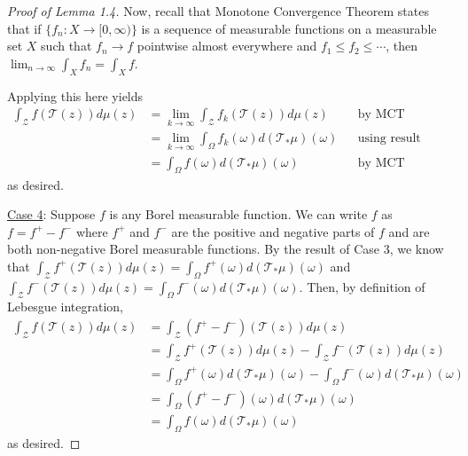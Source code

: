 \documentclass{article}
\begin{document}
\begin{proof}[Proof of Lemma 1.4]
    Now, recall that Monotone Convergence Theorem states that if $\{f_n: X \rightarrow [0, \infty) \}$ is a sequence of measurable functions on a measurable set $X$ such that $f_n \rightarrow f$ pointwise almost everywhere and $f_1 \leq f_2 \leq \cdots$, then $\lim_{n \rightarrow \infty} \int_{X} f_n = \int_{X} f$.

    Applying this here yields
    \begin{align*}
        \int_{\mathcal{Z}} f (\mathcal{T}(z)) d\mu(z) & = 
        \lim_{k \rightarrow \infty} \int_{\mathcal{Z}} f_k (\mathcal{T}(z)) d\mu(z) && \text{by MCT} \\
        & = \lim_{k \rightarrow \infty} \int_{\Omega} f_k (\omega) d(\mathcal{\mathcal{T}_{*}}\mu) (\omega) && \text{using result from Case 2} \\
        & = \int_{\Omega} f (\omega) d(\mathcal{\mathcal{T}_{*}}\mu) (\omega) && \text{by MCT}
    \end{align*}
    as desired.

    \underline{Case 4}: Suppose $f$ is any Borel measurable function. We can write $f$ as $f = f^+ - f^-$ where $f^+$ and $f^-$ are the positive and negative parts of $f$ and are both non-negative Borel measurable functions. By the result of Case 3, we know that $\int_{\mathcal{Z}} f^+(\mathcal{T}(z)) d\mu(z) = \int_{\Omega} f^+(\omega) d(\mathcal{T}_{*}\mu)(\omega)$ and $\int_{\mathcal{Z}} f^-(\mathcal{T}(z)) d\mu(z) = \int_{\Omega} f^-(\omega) d(\mathcal{T}_{*}\mu)(\omega)$. Then, by definition of Lebesgue integration,
    \begin{align*}
        \int_{\mathcal{Z}} f (\mathcal{T}(z)) d\mu(z) & = \int_{\mathcal{Z}} (f^+ - f^-) (\mathcal{T}(z)) d\mu(z)\\
        & = \int_{\mathcal{Z}} f^+(\mathcal{T}(z)) d\mu(z) - \int_{\mathcal{Z}} f^-(\mathcal{T}(z)) d\mu(z) \\ 
        & = \int_{\Omega} f^+(\omega) d(\mathcal{T}_{*}\mu)(\omega) - \int_{\Omega} f^-(\omega) d(\mathcal{T}_{*}\mu)(\omega) \\
        & = \int_{\Omega} (f^+ - f^-) (\omega) d(\mathcal{\mathcal{T}_{*}}\mu) (\omega) \\
        & = \int_{\Omega} f (\omega) d(\mathcal{\mathcal{T}_{*}}\mu) (\omega)
    \end{align*}
    as desired.
    
\end{proof}
\end{document}
